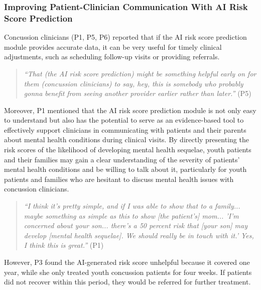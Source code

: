 \subsubsection{Improving Patient-Clinician Communication With AI Risk Score Prediction}
Concussion clinicians (P1, P5, P6) reported that if the AI risk score prediction module provides accurate data, it can be very useful for timely clinical adjustments, such as scheduling follow-up visits or providing referrals.
\begin{quote}
    \textit{``That (the AI risk score prediction) might be something helpful early on for them (concussion clinicians) to say, hey, this is somebody who probably gonna benefit from seeing another provider earlier rather than later.''} (P5)
\end{quote}
Moreover, P1 mentioned that the AI risk score prediction module is not only easy to understand but also has the potential to serve as an evidence-based tool to effectively support clinicians in communicating with patients and their parents about mental health conditions during clinical visits.
By directly presenting the risk scores of the likelihood of developing mental health sequelae, youth patients and their families may gain a clear understanding of the severity of patients' mental health conditions and be willing to talk about it, particularly for youth patients and families who are hesitant to discuss mental health issues with concussion clinicians. 
\begin{quote}
    \textit{``I think it's pretty simple, and if I was able to show that to a family... maybe something as simple as this to show [the patient's] mom... 'I'm concerned about your son... there's a 50 percent risk that [your son] may develop [mental health sequelae]. We should really be in touch with it.' Yes, I think this is great.''} (P1)
\end{quote}
However, P3 found the AI-generated risk score unhelpful because it covered one year, while she only treated youth concussion patients for four weeks.
If patients did not recover within this period, they would be referred for further treatment.

